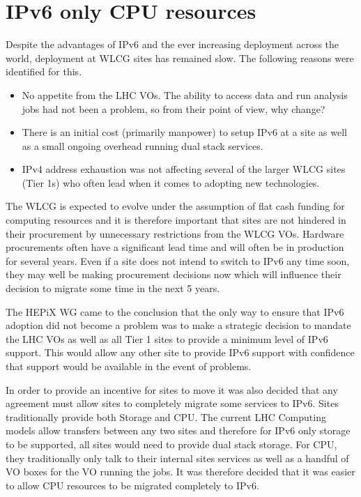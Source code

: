 \documentclass[a4paper]{jpconf}
\begin{document}
\section{IPv6 only CPU resources}
Despite the advantages of IPv6 and the ever increasing deployment across the world, deployment at WLCG sites has remained slow.   The following reasons were identified for this.
\begin{itemize}
\item No appetite from the LHC VOs.  The ability to access data and run analysis jobs had not been a problem, so from their point of view, why change?

\item There is an initial cost (primarily manpower) to setup IPv6 at a site as well as a small ongoing overhead running dual stack services.

\item IPv4 address exhaustion was not affecting several of the larger WLCG sites (Tier 1s) who often lead when it comes to adopting new technologies.
\end{itemize}

The WLCG is expected to evolve under the assumption of flat cash funding for computing resources and it is therefore important that sites are not hindered in their procurement by unnecessary restrictions from the WLCG VOs. Hardware procurements often have a significant lead time and will often be in production for several years.  Even if a site does not intend to switch to IPv6 any time soon, they may well be making procurement decisions now which will influence their decision to migrate some time in the next 5 years.

The HEPiX WG came to the conclusion that the only way to ensure that IPv6 adoption did not become a problem was to make a strategic decision to mandate the LHC VOs as well as all Tier 1 sites to provide a minimum level of IPv6 support.  This would allow any other site to provide IPv6 support with confidence that support would be available in the event of problems.  

In order to provide an incentive for sites to move it was also decided that any agreement must allow sites to completely migrate some services to IPv6.  Sites traditionally provide both Storage and CPU.  The current LHC Computing models allow transfers between any two sites and therefore for IPv6 only storage to be supported, all sites would need to provide dual stack storage.  For CPU, they traditionally only talk to their internal sites services as well as a handful of VO boxes for the VO running the jobs.  It was therefore decided that it was easier to allow CPU resources to be migrated completely to IPv6.  
\end{document}
